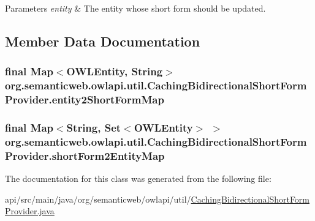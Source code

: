 \begin{DoxyParams}{Parameters}
{\em entity} & The entity whose short form should be updated. \\
\hline
\end{DoxyParams}


\subsection{Member Data Documentation}
\hypertarget{classorg_1_1semanticweb_1_1owlapi_1_1util_1_1_caching_bidirectional_short_form_provider_acea4d46e2b3f158403024c7aaed79349}{
\subsubsection[{entity2\-Short\-Form\-Map}]{\setlength{\rightskip}{0pt plus 5cm}final Map$<${\bf O\-W\-L\-Entity}, String$>$ org.\-semanticweb.\-owlapi.\-util.\-Caching\-Bidirectional\-Short\-Form\-Provider.\-entity2\-Short\-Form\-Map\hspace{0.3cm}{\ttfamily [private]}}}\label{classorg_1_1semanticweb_1_1owlapi_1_1util_1_1_caching_bidirectional_short_form_provider_acea4d46e2b3f158403024c7aaed79349}
\hypertarget{classorg_1_1semanticweb_1_1owlapi_1_1util_1_1_caching_bidirectional_short_form_provider_a7f02f323f6713a39116db70eeb001ebe}{
\subsubsection[{short\-Form2\-Entity\-Map}]{\setlength{\rightskip}{0pt plus 5cm}final Map$<$String, Set$<${\bf O\-W\-L\-Entity}$>$ $>$ org.\-semanticweb.\-owlapi.\-util.\-Caching\-Bidirectional\-Short\-Form\-Provider.\-short\-Form2\-Entity\-Map\hspace{0.3cm}{\ttfamily [private]}}}\label{classorg_1_1semanticweb_1_1owlapi_1_1util_1_1_caching_bidirectional_short_form_provider_a7f02f323f6713a39116db70eeb001ebe}


The documentation for this class was generated from the following file\-:\begin{DoxyCompactItemize}
\item 
api/src/main/java/org/semanticweb/owlapi/util/\hyperlink{_caching_bidirectional_short_form_provider_8java}{Caching\-Bidirectional\-Short\-Form\-Provider.\-java}\end{DoxyCompactItemize}
